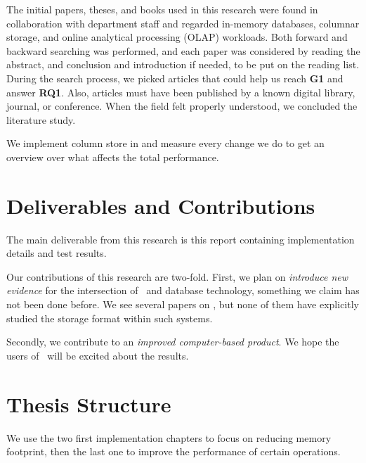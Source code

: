 The initial papers, theses, and books used in this research were found in collaboration with department staff and regarded in-memory databases, columnar storage, and online analytical processing (OLAP) workloads. Both forward and backward searching was performed, and each paper was considered by reading the abstract, and conclusion and introduction if needed, to be put on the reading list. During the search process, we picked articles that could help us reach \textbf{G1} and answer \textbf{RQ1}. Also, articles must have been published by a known digital library, journal, or conference. When the field felt properly understood, we concluded the  literature study.

We implement column store in \gap and measure every change we do to get an overview over what affects the total performance.



\section{Deliverables and Contributions}
\label{sec:Deliverables and Contributions}
The main deliverable from this research is this report containing implementation details and test results.

Our contributions of this research are two-fold. First, we plan on \textit{introduce new evidence} for the intersection of \mdd~and database technology, something we claim has not been done before. We see several papers on \mdd, but none of them have explicitly studied the storage format within such systems.

Secondly, we contribute to an \textit{improved computer-based product}. We hope the users of \gap~will be excited about the results.


\section{Thesis Structure}
\label{sec:Thesis Structure}
We use the two first implementation chapters to focus on reducing memory footprint, then the last one to improve the performance of certain operations.

